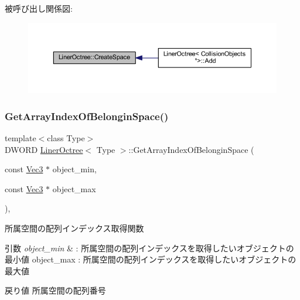 被呼び出し関係図\+:\nopagebreak
\begin{figure}[H]
\begin{center}
\leavevmode
\includegraphics[width=350pt]{class_liner_octree_a62aa42a787a399c3651bac3bbef8f1a6_icgraph}
\end{center}
\end{figure}
\mbox{\label{class_liner_octree_a4d7c6e47990d16ed28e3ab89443c1af4}} 
\subsubsection{\texorpdfstring{Get\+Array\+Index\+Of\+Belongin\+Space()}{GetArrayIndexOfBelonginSpace()}}
{\footnotesize\ttfamily template$<$class Type$>$ \\
D\+W\+O\+RD \mbox{\hyperlink{class_liner_octree}{Liner\+Octree}}$<$ Type $>$\+::Get\+Array\+Index\+Of\+Belongin\+Space (\begin{DoxyParamCaption}\item[{const \mbox{\hyperlink{_vector3_d_8h_ab16f59e4393f29a01ec8b9bbbabbe65d}{Vec3}} $\ast$}]{object\+\_\+min,  }\item[{const \mbox{\hyperlink{_vector3_d_8h_ab16f59e4393f29a01ec8b9bbbabbe65d}{Vec3}} $\ast$}]{object\+\_\+max }\end{DoxyParamCaption})\hspace{0.3cm}{\ttfamily [inline]}, {\ttfamily [private]}}



所属空間の配列インデックス取得関数 


\begin{DoxyParams}{引数}
{\em object\+\_\+min} & \+: 所属空間の配列インデックスを取得したいオブジェクトの最小値 object\+\_\+max \+: 所属空間の配列インデックスを取得したいオブジェクトの最大値 \\
\hline
\end{DoxyParams}
\begin{DoxyReturn}{戻り値}
所属空間の配列番号 
\end{DoxyReturn}


